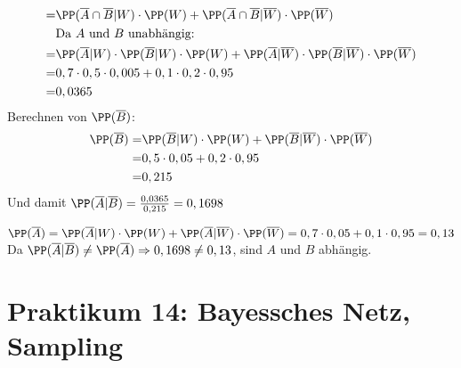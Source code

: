 \documentclass{scrreprt}
\begin{document}
\begin{anumerate}
\begin{align*}
=& \PP(\overline{A} \cap \overline{B}|W)\cdot \PP(W) + \PP(\overline{A} \cap \overline{B}|\overline{W})\cdot \PP(\overline{W})\\
&\text{Da }A\text{ und }B\text{ unabhängig:}\\ 
=&\PP(\overline{A}|W) \cdot \PP(\overline{B}|W) \cdot \PP(W)+\PP(\overline{A}|\overline{W}) \cdot \PP(\overline{B}|\overline{W}) \cdot \PP(\overline{W})\\
=& 0,7 \cdot 0,5 \cdot 0,005 + 0,1 \cdot 0,2 \cdot 0,95\\
=&0,0365
\end{align*}
Berechnen von $\PP(\overline{B})$:
\begin{align*}
\PP(\overline{B})=&\PP(\overline{B}|W) \cdot \PP(W) + \PP(\overline{B}|\overline{W}) \cdot \PP(\overline{W})\\
=&0,5 \cdot 0,05 + 0,2 \cdot 0,95\\
=&0,215
\end{align*}
Und damit $\PP(\overline{A}|\overline{B})=\frac{0,0365}{0,215}=0,1698$
\item $\PP(\overline{A})=\PP(\overline{A}|W) \cdot \PP(W) + \PP(\overline{A}|\overline{W}) \cdot \PP(\overline{W})=0,7\cdot 0,05 + 0,1 \cdot 0,95=0,13$\\
Da $\PP(\overline{A}|\overline{B})\not = \PP(\overline{A}) \Rightarrow 0,1698 \not = 0,13$, sind $A$ und $B$ abhängig.
\end{anumerate}

\chapter{Praktikum 14: Bayessches Netz, Sampling}
\end{document}
